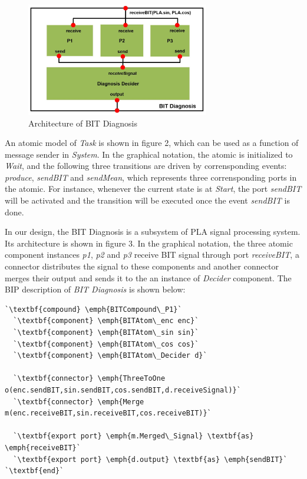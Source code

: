 \begin{figure}[ht!]
	\centering
	\includegraphics[width=80mm]{figure/figure4.jpg}
	\caption{Architecture of BIT Diagnosis}
	\label{BIT_Model}
\end{figure}

An atomic model of \emph{Task} is shown in figure 2, which can be used as a function of message sender in \emph{System}. In the graphical notation, the atomic is initialized to \emph{Wait}, and the following three transitions are driven by corrensponding events: \emph{produce}, \emph{sendBIT} and \emph{sendMean}, which represents three corrensponding ports in the atomic. For instance, whenever the current state is at \emph{Start}, the port \emph{sendBIT} will be activated and the transition will be executed once the event \emph{sendBIT} is done.

In our design, the BIT Diagnosis is a subsystem of PLA signal processing system. Its architecture is shown in figure 3. In the graphical notation, the three atomic component instances \emph{p1}, \emph{p2} and \emph{p3} receive BIT signal through port \emph{receiveBIT}, a connector distributes the signal to these components and another connector merges their output and sends it to the an instance of \emph{Decider} component. The BIP description of \emph{BIT Diagnosis} is shown below:

\begin{lstlisting}
`\textbf{compound} \emph{BITCompound\_P1}`
  `\textbf{component} \emph{BITAtom\_enc enc}`
  `\textbf{component} \emph{BITAtom\_sin sin}`
  `\textbf{component} \emph{BITAtom\_cos cos}`
  `\textbf{component} \emph{BITAtom\_Decider d}`
  
  `\textbf{connector} \emph{ThreeToOne o(enc.sendBIT,sin.sendBIT,cos.sendBIT,d.receiveSignal)}`
  `\textbf{connector} \emph{Merge m(enc.receiveBIT,sin.receiveBIT,cos.receiveBIT)}`
  
  `\textbf{export port} \emph{m.Merged\_Signal} \textbf{as} \emph{receiveBIT}`
  `\textbf{export port} \emph{d.output} \textbf{as} \emph{sendBIT}`
`\textbf{end}`
\end{lstlisting}

